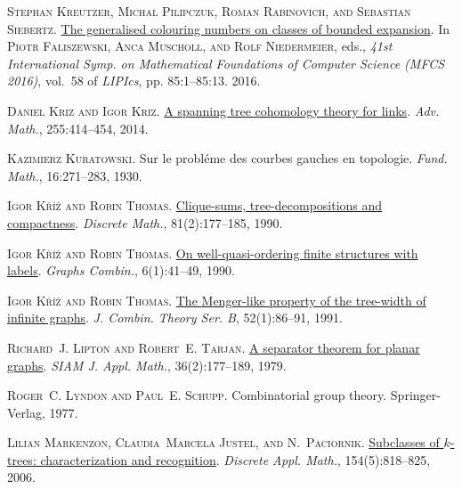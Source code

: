 \documentclass[a4paper,11pt]{article}
\theoremstyle{plain}
\theoremstyle{definition}
\begin{document}
\textsc{Stephan Kreutzer, Michal Pilipczuk, Roman Rabinovich, and Sebastian
  Siebertz}.
\newblock \href{https://doi.org/10.4230/LIPIcs.MFCS.2016.85}{The generalised
  colouring numbers on classes of bounded expansion}.
\newblock In \textsc{Piotr Faliszewski, Anca Muscholl, and Rolf Niedermeier},
  eds., \emph{41st International Symp. on Mathematical Foundations of Computer
  Science ({MFCS} 2016)}, vol.~58 of \emph{LIPIcs}, pp. 85:1--85:13. 2016.

\textsc{Daniel Kriz and Igor Kriz}.
\newblock \href{https://doi.org/10.1016/j.aim.2014.01.006}{A spanning tree
  cohomology theory for links}.
\newblock \emph{Adv. Math.}, 255:414--454, 2014.

\textsc{Kazimierz Kuratowski}.
\newblock Sur le probl\'{e}me des courbes gauches en topologie.
\newblock \emph{Fund. Math.}, 16:271--283, 1930.

\textsc{Igor K\v{r}\'{\i}\v{z} and Robin Thomas}.
\newblock \href{https://doi.org/10.1016/0012-365X(90)90150-G}{Clique-sums,
  tree-decompositions and compactness}.
\newblock \emph{Discrete Math.}, 81(2):177--185, 1990{}.

\textsc{Igor K\v{r}\'{\i}\v{z} and Robin Thomas}.
\newblock \href{https://doi.org/10.1007/BF01787479}{On well-quasi-ordering
  finite structures with labels}.
\newblock \emph{Graphs Combin.}, 6(1):41--49, 1990{}.

\textsc{Igor K\v{r}\'{\i}\v{z} and Robin Thomas}.
\newblock \href{https://doi.org/10.1016/0095-8956(91)90093-Y}{The {M}enger-like
  property of the tree-width of infinite graphs}.
\newblock \emph{J. Combin. Theory Ser. B}, 52(1):86--91, 1991.

\textsc{Richard~J. Lipton and Robert~E. Tarjan}.
\newblock \href{https://doi.org/10.1137/0136016}{A separator theorem for planar
  graphs}.
\newblock \emph{SIAM J. Appl. Math.}, 36(2):177--189, 1979.

\textsc{Roger~C. Lyndon and Paul~E. Schupp}.
\newblock Combinatorial group theory.
\newblock Springer-Verlag, 1977.

\textsc{Lilian Markenzon, Claudia~Marcela Justel, and N.~Paciornik}.
\newblock \href{https://doi.org/10.1016/j.dam.2005.05.021}{Subclasses of
  {$k$}-trees: characterization and recognition}.
\newblock \emph{Discrete Appl. Math.}, 154(5):818--825, 2006.
\end{document}
